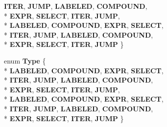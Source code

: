 \begin{DoxyCompactItemize}
{\bfseries I\-T\-E\-R}, 
{\bfseries J\-U\-M\-P}, 
{\bfseries L\-A\-B\-E\-L\-E\-D}, 
{\bfseries C\-O\-M\-P\-O\-U\-N\-D}, 
\\*
{\bfseries E\-X\-P\-R}, 
{\bfseries S\-E\-L\-E\-C\-T}, 
{\bfseries I\-T\-E\-R}, 
{\bfseries J\-U\-M\-P}, 
\\*
{\bfseries L\-A\-B\-E\-L\-E\-D}, 
{\bfseries C\-O\-M\-P\-O\-U\-N\-D}, 
{\bfseries E\-X\-P\-R}, 
{\bfseries S\-E\-L\-E\-C\-T}, 
\\*
{\bfseries I\-T\-E\-R}, 
{\bfseries J\-U\-M\-P}, 
{\bfseries L\-A\-B\-E\-L\-E\-D}, 
{\bfseries C\-O\-M\-P\-O\-U\-N\-D}, 
\\*
{\bfseries E\-X\-P\-R}, 
{\bfseries S\-E\-L\-E\-C\-T}, 
{\bfseries I\-T\-E\-R}, 
{\bfseries J\-U\-M\-P}
 \}
\item 
enum {\bfseries Type} \{ \\*
{\bfseries L\-A\-B\-E\-L\-E\-D}, 
{\bfseries C\-O\-M\-P\-O\-U\-N\-D}, 
{\bfseries E\-X\-P\-R}, 
{\bfseries S\-E\-L\-E\-C\-T}, 
\\*
{\bfseries I\-T\-E\-R}, 
{\bfseries J\-U\-M\-P}, 
{\bfseries L\-A\-B\-E\-L\-E\-D}, 
{\bfseries C\-O\-M\-P\-O\-U\-N\-D}, 
\\*
{\bfseries E\-X\-P\-R}, 
{\bfseries S\-E\-L\-E\-C\-T}, 
{\bfseries I\-T\-E\-R}, 
{\bfseries J\-U\-M\-P}, 
\\*
{\bfseries L\-A\-B\-E\-L\-E\-D}, 
{\bfseries C\-O\-M\-P\-O\-U\-N\-D}, 
{\bfseries E\-X\-P\-R}, 
{\bfseries S\-E\-L\-E\-C\-T}, 
\\*
{\bfseries I\-T\-E\-R}, 
{\bfseries J\-U\-M\-P}, 
{\bfseries L\-A\-B\-E\-L\-E\-D}, 
{\bfseries C\-O\-M\-P\-O\-U\-N\-D}, 
\\*
{\bfseries E\-X\-P\-R}, 
{\bfseries S\-E\-L\-E\-C\-T}, 
{\bfseries I\-T\-E\-R}, 
{\bfseries J\-U\-M\-P}
 \}
\end{DoxyCompactItemize}
